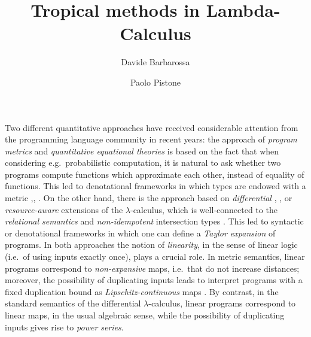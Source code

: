 \documentclass[submission,%
]{eptcs}
\title{Tropical methods in Lambda-Calculus}
\author{Davide Barbarossa
\institute{DISI, Universit\`a di Bologna}
\email{davide.barbarossa@unibo.it}
\and
\qquad\qquad Paolo Pistone
\institute{\qquad\qquad\qquad DISI, Universit\`a di Bologna}
\email{\qquad\qquad\qquad paolo.pistone@unibo.it}
}
\begin{document}
\maketitle



Two different quantitative approaches have received considerable attention from the programming language community in recent years: %
the approach of \emph{program metrics} \cite{Reed2010, Gaboardi2017, Gabo2019} and \emph{quantitative equational theories} \cite{Plotk} is based on the fact that when considering e.g.\ probabilistic %
computation, %
it is natural to ask whether two programs compute functions which %
approximate each other, instead of equality of functions.
This led to denotational frameworks in which types are endowed with a metric \cite{Reed2010},\cite{Bonchi2018}, \cite{Geoffroy2020, PistoneLICS, PistoneFSCD2022}.
On the other hand, there is the approach based on \emph{differential} \cite{difflambda}, \cite{difflambda}, \cite{Manzo2013, Breuvart2018, PistoneLICS2022} or \emph{resource-aware} \cite{Boudol1993} extensions of the $\lambda$-calculus, which is well-connected to the \emph{relational semantics} \cite{Manzo2012, Manzo2013, dill} and \emph{non-idempotent} intersection types \cite{decarvalho2018, Mazza2016}.
This led to syntactic or denotational frameworks in which one can define a \emph{Taylor expansion} of programs.
In both approaches the notion of \emph{linearity}, in the sense of linear logic \cite{girardLl} (i.e.~of using inputs exactly once), plays a crucial role.
In metric semantics, linear programs correspond to \emph{non-expansive} maps, i.e.\ that do not increase distances; moreover, the possibility of duplicating inputs leads to interpret programs with a fixed duplication bound as \emph{Lipschitz-continuous} maps \cite{Gaboardi2017}.
By contrast, in the standard semantics of the differential $\lambda$-calculus, linear programs correspond to linear maps, in the usual algebraic sense, while the possibility of duplicating inputs gives rise to \emph{power series}.
\end{document}
